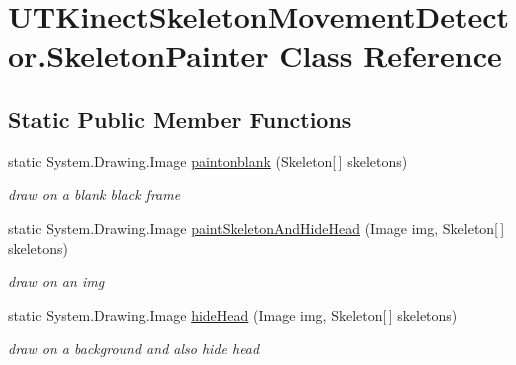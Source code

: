 \hypertarget{class_u_t_kinect_skeleton_movement_detector_1_1_skeleton_painter}{\section{U\-T\-Kinect\-Skeleton\-Movement\-Detector.\-Skeleton\-Painter Class Reference}
\label{class_u_t_kinect_skeleton_movement_detector_1_1_skeleton_painter}
}
\subsection*{Static Public Member Functions}
\begin{DoxyCompactItemize}
\item 
static System.\-Drawing.\-Image \hyperlink{class_u_t_kinect_skeleton_movement_detector_1_1_skeleton_painter_a7fdb142bafc43845084ae2208ad98ed4}{paintonblank} (Skeleton\mbox{[}$\,$\mbox{]} skeletons)
\begin{DoxyCompactList}\small\item\em draw on a blank black frame \end{DoxyCompactList}\item 
static System.\-Drawing.\-Image \hyperlink{class_u_t_kinect_skeleton_movement_detector_1_1_skeleton_painter_a75e75c7dc95899e548e0b294cd164c3b}{paint\-Skeleton\-And\-Hide\-Head} (Image img, Skeleton\mbox{[}$\,$\mbox{]} skeletons)
\begin{DoxyCompactList}\small\item\em draw on an img \end{DoxyCompactList}\item 
static System.\-Drawing.\-Image \hyperlink{class_u_t_kinect_skeleton_movement_detector_1_1_skeleton_painter_ad4f37b20c059cd693d3e557aeee44377}{hide\-Head} (Image img, Skeleton\mbox{[}$\,$\mbox{]} skeletons)
\begin{DoxyCompactList}\small\item\em draw on a background and also hide head \end{DoxyCompactList}\end{DoxyCompactItemize}


